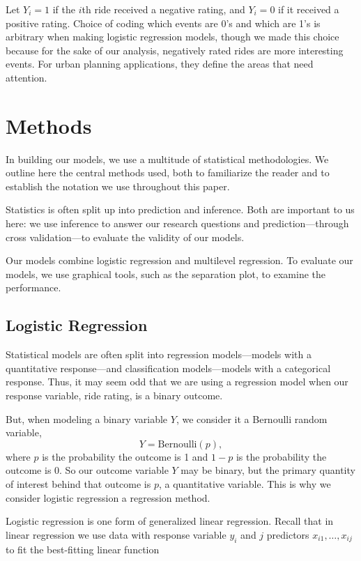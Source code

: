 \documentclass[12pt,twoside]{reedthesis}
\begin{document}
  Let \(Y_i = 1\) if the \(i\)th ride received a negative rating, and
  \(Y_i = 0\) if it received a positive rating. Choice of coding which
  events are 0's and which are 1's is arbitrary when making logistic
  regression models, though we made this choice because for the sake of
  our analysis, negatively rated rides are more interesting events. For
  urban planning applications, they define the areas that need attention.
  
  \chapter{Methods}\label{methods}
  
  In building our models, we use a multitude of statistical methodologies.
  We outline here the central methods used, both to familiarize the reader
  and to establish the notation we use throughout this paper.
  
  Statistics is often split up into prediction and inference. Both are
  important to us here: we use inference to answer our research questions
  and prediction---through cross validation---to evaluate the validity of
  our models.
  
  Our models combine logistic regression and multilevel regression. To
  evaluate our models, we use graphical tools, such as the separation
  plot, to examine the performance.
  
  \section{Logistic Regression}\label{logistic-regression}
  
  Statistical models are often split into regression models---models with
  a quantitative response---and classification models---models with a
  categorical response. Thus, it may seem odd that we are using a
  regression model when our response variable, ride rating, is a binary
  outcome.
  
  But, when modeling a binary variable \(Y\), we consider it a Bernoulli
  random variable, \[Y = \text{Bernoulli}(p),\] where \(p\) is the
  probability the outcome is 1 and \(1-p\) is the probability the outcome
  is 0. So our outcome variable \(Y\) may be binary, but the primary
  quantity of interest behind that outcome is \(p\), a quantitative
  variable. This is why we consider logistic regression a regression
  method.
  
  Logistic regression is one form of generalized linear regression. Recall
  that in linear regression we use data with response variable \(y_i\) and
  \(j\) predictors \(x_{i1}, \ldots, x_{ij}\) to fit the best-fitting
  linear function
  
\end{document}
